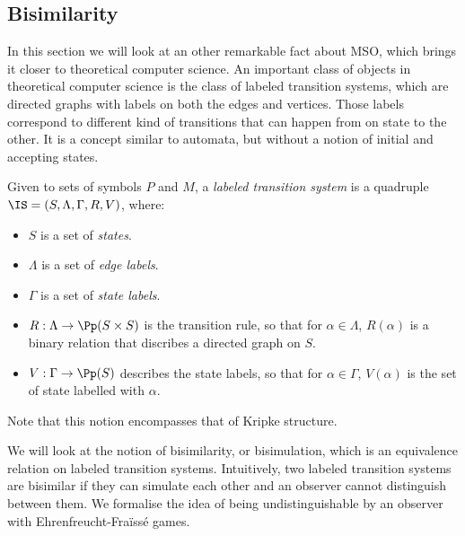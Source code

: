 \subsection{Bisimilarity}

In this section we will look at an other remarkable fact
about MSO, which brings it closer to theoretical computer science.
An important class of objects in theoretical computer science
is the class of labeled transition systems,
which are directed graphs with labels on both the edges and vertices.
Those labels correspond to different kind of transitions
that can happen from on state to the other. It is a concept similar
to automata, but without a notion of initial and accepting states.

\begin{definition}
    Given to sets of symbols $P$ and $M$,
    a \emph{labeled transition system}
    is a quadruple $\IS = (S, \Lambda, \Gamma, R, V)$, where:
    \begin{itemize}
        \item $S$ is a set of \emph{states}.
        \item $\Lambda$ is a set of \emph{edge labels}.
        \item $\Gamma$ is a set of \emph{state labels}.
        \item $R: \Lambda \to \Pp(S \times S)$ is the transition rule,
            so that for $\alpha \in \Lambda$, $R(\alpha)$ is a binary relation
            that discribes a directed graph on $S$.
        \item $V: \Gamma \to \Pp(S)$ describes the state labels,
            so that for $\alpha \in \Gamma$,
            $V(\alpha)$ is the set of state labelled with $\alpha$.
    \end{itemize}

    Note that this notion encompasses that of Kripke structure.
\end{definition}

We will look at the notion of bisimilarity, or bisimulation, which is
an equivalence relation on labeled transition systems.
Intuitively, two labeled transition systems are bisimilar if
they can simulate each other and an observer cannot distinguish
between them.
We formalise the idea of being undistinguishable
by an observer with Ehrenfreucht-Fraïssé games.


